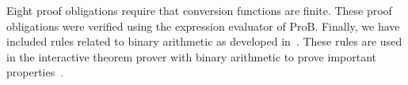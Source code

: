 \documentclass[a4paper]{llncs}
\begin{document}
Eight proof obligations require that conversion functions are finite. %
 These proof obligations were verified using the expression evaluator of ProB.
Finally, we have included rules related to binary arithmetic as developed
in~\cite{Leibnizens}. These rules are used in the interactive theorem prover with
binary arithmetic to prove important properties~\cite{James2010,Dasgupta2006}.



% 
% 
\end{document}
